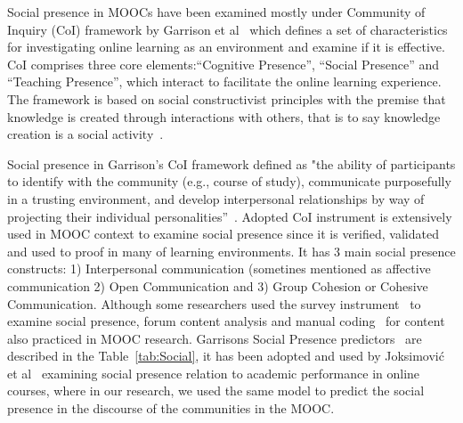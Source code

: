 \documentclass[format=acmsmall, review=false, screen=true]{acmart}
\begin{document}
Social presence in MOOCs have been examined mostly under Community of Inquiry (CoI) framework by Garrison et al~\cite{garrison2009communities} which defines a set of characteristics for investigating online learning as an environment and examine if it is effective. CoI comprises three core elements:“Cognitive Presence”, “Social Presence” and “Teaching Presence”, which interact to facilitate the online learning experience. The framework is based on social constructivist principles with the premise that knowledge is created through interactions with others, that is to say knowledge creation is a social activity~\cite{akyol2009response}. 

Social presence in Garrison's CoI framework defined as "the ability of participants to identify with the community (e.g., course of study), communicate purposefully in a trusting environment, and
develop interpersonal relationships by way of projecting their individual personalities”~\cite{garrison2009communities}. Adopted CoI instrument is extensively used in MOOC context to examine social presence since it is verified, validated and used to proof in many of learning environments. It has 3 main social presence constructs: 1) Interpersonal communication (sometines mentioned as affective communication 2) Open Communication and 3) Group Cohesion or Cohesive Communication. Although some researchers used the survey instrument~\cite{poquet2018social} to examine social presence, forum content analysis and manual coding~\cite{oleksandra2016untangling,joksimovic2015social} for content also practiced in MOOC research. Garrisons Social Presence predictors~\cite{garrison2009communities} are described in the Table~\ref{tab:Social}, it has been adopted and used by Joksimović et al~\cite{joksimovic2015social} examining social presence relation to academic performance in online courses, where in our research, we used the same model to predict the social presence in the discourse of the communities in the MOOC. 
\end{document}
